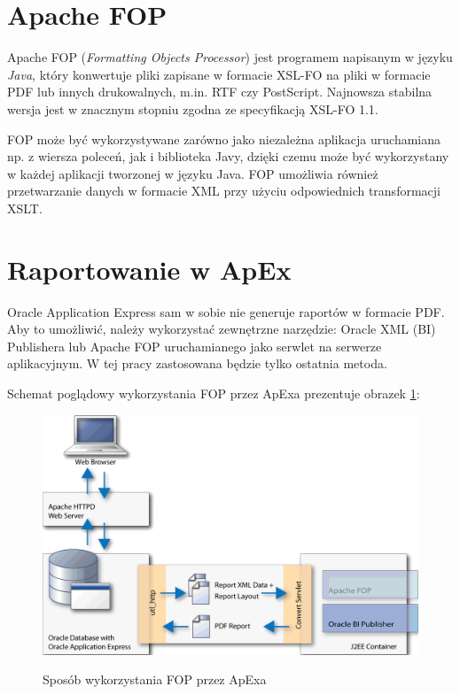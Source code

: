 \documentclass[11pt,a4paper]{article}
\begin{document}
\section{Apache FOP}\label{sec:fop}
Apache FOP (\emph{Formatting Objects Processor}) jest programem napisanym w języku \emph{Java}, który konwertuje pliki zapisane w formacie XSL-FO na pliki w formacie PDF lub innych drukowalnych, m.in. RTF czy PostScript. Najnowsza stabilna wersja jest w znacznym stopniu zgodna ze specyfikacją XSL-FO 1.1. 

FOP może być wykorzystywane zarówno jako niezależna aplikacja uruchamiana np. z wiersza poleceń, jak i biblioteka Javy, dzięki czemu może być wykorzystany w każdej aplikacji tworzonej w języku Java. FOP umożliwia również przetwarzanie danych w formacie XML przy użyciu odpowiednich transformacji XSLT.

\section{Raportowanie w ApEx}\label{sec:raporapex}
Oracle Application Express sam w sobie nie generuje raportów w formacie PDF. Aby to umożliwić, należy wykorzystać zewnętrzne narzędzie: Oracle XML (BI) Publishera lub Apache FOP uruchamianego jako serwlet na serwerze aplikacyjnym. W tej pracy zastosowana będzie tylko ostatnia metoda.

Schemat poglądowy wykorzystania FOP przez ApExa prezentuje obrazek \ref{fop:apex_usage}:\\

\begin{figure}[h]
\centering
\caption{Sposób wykorzystania FOP przez ApExa}
\includegraphics[scale=0.5]{apex_fop_usage}
\label{fop:apex_usage}
\end{figure}
\end{document}
